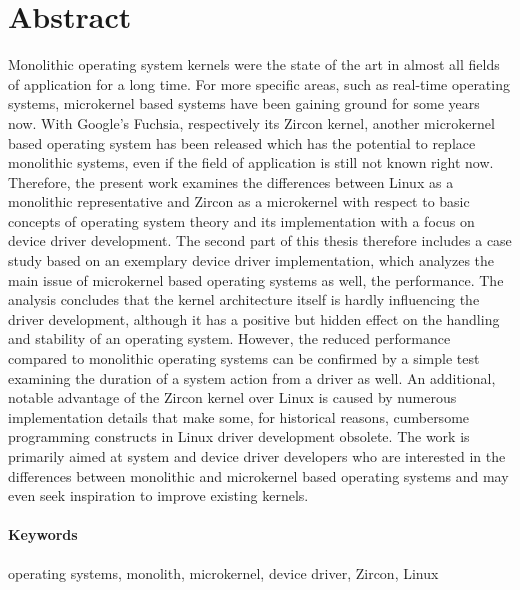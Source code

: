 \section*{Abstract}
Monolithic operating system kernels were the state of the art in almost all fields of application for a long time.
For more specific areas, such as real-time operating systems, microkernel based systems have been gaining ground for some years now.
With Google's Fuchsia, respectively its Zircon kernel, another microkernel based operating system has been released which has the potential to replace monolithic systems, even if the field of application is still not known right now.
Therefore, the present work examines the differences between Linux as a monolithic representative and Zircon as a microkernel with respect to basic concepts of operating system theory and its implementation with a focus on device driver development.
The second part of this thesis therefore includes a case study based on an exemplary device driver implementation, which analyzes the main issue of microkernel based operating systems as well, the performance.
The analysis concludes that the kernel architecture itself is hardly influencing the driver development, although it has a positive but hidden effect on the handling and stability of an operating system.
However, the reduced performance compared to monolithic operating systems can be confirmed by a simple test examining the duration of a system action from a driver as well.
An additional, notable advantage of the Zircon kernel over Linux is caused by numerous implementation details that make some, for historical reasons, cumbersome programming constructs in Linux driver development obsolete.
The work is primarily aimed at system and device driver developers who are interested in the differences between monolithic and microkernel based operating systems and may even seek inspiration to improve existing kernels.

\paragraph{Keywords} operating systems, monolith, microkernel, device driver, Zircon, Linux


